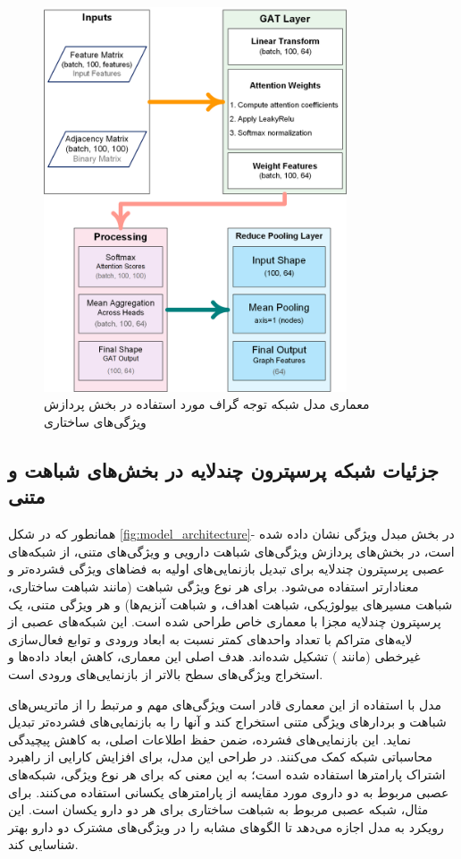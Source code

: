 \begin{figure}[!t]
	\centering
	\includegraphics[width=0.8\textwidth]{images/gat-model.png}
	\caption{معماری مدل شبکه توجه گراف مورد استفاده در بخش پردازش ویژگی‌های ساختاری}
	\label{fig:gat_model}
\end{figure}

\subsection{جزئیات شبکه‌ پرسپترون چندلایه در بخش‌های شباهت و متنی}

همانطور که در شکل \ref{fig:model_architecture}- در بخش مبدل ویژگی نشان داده شده است، در بخش‌های پردازش ویژگی‌های شباهت دارویی و ویژگی‌های متنی، از شبکه‌های عصبی پرسپترون چندلایه برای تبدیل بازنمایی‌های اولیه به فضاهای ویژگی فشرده‌تر و معنادارتر استفاده می‌شود. برای هر نوع ویژگی شباهت (مانند شباهت ساختاری، شباهت مسیرهای بیولوژیکی، شباهت اهداف، و شباهت آنزیم‌ها) و هر ویژگی متنی، یک پرسپترون چندلایه مجزا با معماری خاص طراحی شده است. این شبکه‌های عصبی از لایه‌های متراکم با تعداد واحدهای کمتر نسبت به ابعاد ورودی و توابع فعال‌سازی غیرخطی (مانند ) تشکیل شده‌اند. هدف اصلی این معماری، کاهش ابعاد داده‌ها و استخراج ویژگی‌های سطح بالاتر از بازنمایی‌های ورودی است.

مدل با استفاده از این معماری قادر است ویژگی‌های مهم و مرتبط را از ماتریس‌های شباهت و بردارهای ویژگی متنی استخراج کند و آنها را به بازنمایی‌های فشرده‌تر تبدیل نماید. این بازنمایی‌های فشرده، ضمن حفظ اطلاعات اصلی، به کاهش پیچیدگی محاسباتی شبکه کمک می‌کنند. در طراحی این مدل، برای افزایش کارایی از راهبرد اشتراک پارامترها استفاده شده است؛ به این معنی که برای هر نوع ویژگی، شبکه‌های عصبی مربوط به دو داروی مورد مقایسه از پارامترهای یکسانی استفاده می‌کنند. برای مثال، شبکه عصبی مربوط به شباهت ساختاری برای هر دو دارو یکسان است. این رویکرد به مدل اجازه می‌دهد تا الگوهای مشابه را در ویژگی‌های مشترک دو دارو بهتر شناسایی کند.


